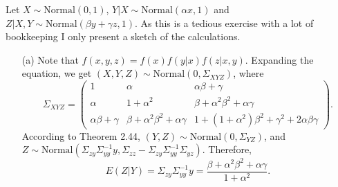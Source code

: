 Let $X \sim \mathrm{Normal}(0, 1)$, $Y|X \sim \mathrm{Normal}(\alpha x, 1)$ and $Z|X,Y \sim \mathrm{Normal}(\beta y + \gamma z, 1)$.
As this is a tedious exercise with a lot of bookkeeping I only present a sketch of the calculations.
\begin{itemize}
    \item[(a)] Note that $f(x, y, z) = f(x)f(y|x)f(z|x,y)$.
        Expanding the equation, we get $(X, Y, Z) \sim \mathrm{Normal}(0, \Sigma_{XYZ})$, where
        \begin{equation*}
            \Sigma_{XYZ} = \begin{pmatrix}
                1 & \alpha & \alpha \beta + \gamma \\
                \alpha & 1 + \alpha^2 & \beta + \alpha^2 \beta^2 + \alpha \gamma \\
                \alpha \beta + \gamma & \beta + \alpha^2 \beta^2 + \alpha \gamma & 1 + (1 + \alpha^2) \beta^2 + \gamma^2 + 2 \alpha \beta \gamma
            \end{pmatrix}.
        \end{equation*}
        According to Theorem 2.44, $(Y,Z) \sim \mathrm{Normal}(0, \Sigma_{YZ})$, and $Z \sim \mathrm{Normal}(\Sigma_{zy} \Sigma_{yy}^{-1} y, \Sigma_{zz} - \Sigma_{zy} \Sigma_{yy}^{-1} \Sigma_{yz})$.
        Therefore,
        \begin{equation*}
            E(Z|Y) = \Sigma_{zy} \Sigma_{yy}^{-1} y
                = \frac{\beta + \alpha^2 \beta^2 + \alpha \gamma}{1 + \alpha^2}.
        \end{equation*}
\end{itemize}
